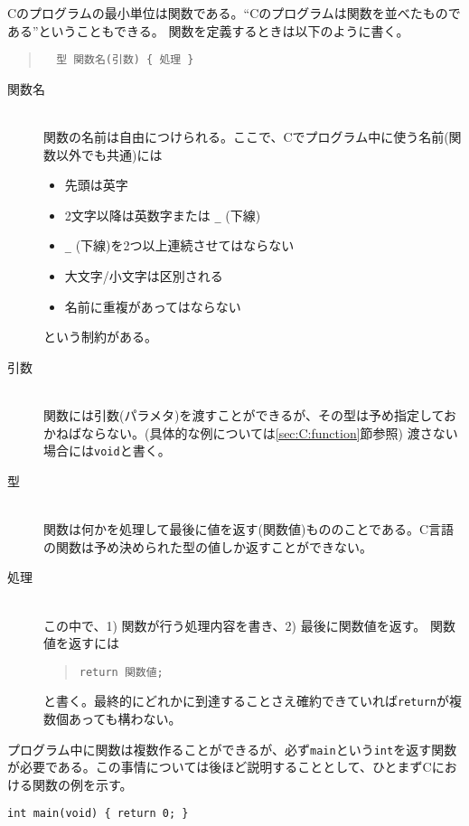 Cのプログラムの最小単位は関数である。``Cのプログラムは関数を並べたものである''ということもできる。
関数を定義するときは以下のように書く。
\begin{quote}
    \begin{verbatim}
  型 関数名(引数) { 処理 }
  \end{verbatim}
\end{quote}
\begin{description}
    \item[関数名]\mbox{}\\
          関数の名前は自由につけられる。ここで、Cでプログラム中に使う名前(関数以外でも共通)には
          \begin{itemize}
              \item 先頭は英字
              \item 2文字以降は英数字または \texttt{\_} (下線)
              \item \texttt{\_} (下線)を2つ以上連続させてはならない
              \item 大文字/小文字は区別される
              \item 名前に重複があってはならない
          \end{itemize}
          という制約がある。
    \item[引数]\mbox{}\\
          関数には引数(パラメタ)を渡すことができるが、その型は予め指定しておかねばならない。(具体的な例については\ref{sec:C:function}節参照)
          渡さない場合には\texttt{void}と書く。
    \item[型]\mbox{}\\
          関数は何かを処理して最後に値を返す(関数値)もののことである。C言語の関数は予め決められた型の値しか返すことができない。
    \item[処理]\mbox{}\\
          この中で、1) 関数が行う処理内容を書き、2) 最後に関数値を返す。
          関数値を返すには
          \begin{quote}
              \begin{verbatim}return 関数値;
            \end{verbatim}
          \end{quote}
          と書く。最終的にどれかに到達することさえ確約できていれば\texttt{return}が複数個あっても構わない。
\end{description}
プログラム中に関数は複数作ることができるが、必ず\texttt{main}という\texttt{int}を返す関数が必要である。この事情については後ほど説明することとして、ひとまずCにおける関数の例を示す。
\begin{reidai}\label{ex:hinagata1}
    \begin{verbatim}
int main(void) { return 0; }
\end{verbatim}
\end{reidai}

